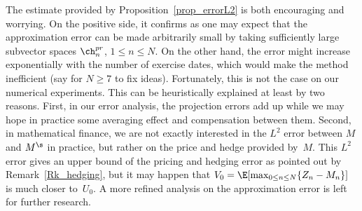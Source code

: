 The estimate provided by Proposition~\ref{prop_errorL2} is both encouraging and worrying. On the positive side, it confirms as one may expect that the approximation error can be made arbitrarily small by taking sufficiently large subvector spaces $\ch^{pr}_n$, $1\le n\le N$. On the other hand, the error might increase exponentially with the number of exercise dates, which would make the method inefficient (say for $N \ge 7$ to fix ideas). Fortunately, this is not the case on our numerical experiments. This can be heuristically explained at least by two reasons. First, in our error analysis, the projection errors add up while we may hope in practice some averaging effect and compensation between them. Second, in mathematical finance, we are not exactly interested in the $L^2$ error between $M$ and $M^\s$ in practice, but rather on the price and hedge provided by~$M$. This $L^2$ error gives an upper bound of the pricing and hedging error as pointed out by Remark~\ref{Rk_hedging}, but it may happen that $V_0=\E[\max_{0\le n \le N} \{Z_n-M_n\}]$ is much closer to~$U_0$. A more refined analysis on the approximation error is left for further research.

